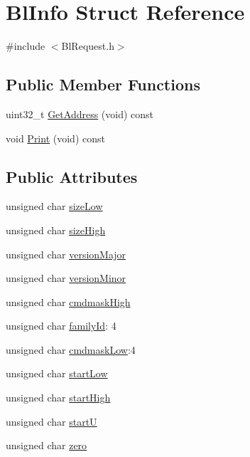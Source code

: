 \hypertarget{struct_bl_info}{\section{Bl\-Info Struct Reference}
\label{struct_bl_info}
}


{\ttfamily \#include $<$Bl\-Request.\-h$>$}

\subsection*{Public Member Functions}
\begin{DoxyCompactItemize}
\item 
uint32\-\_\-t \hyperlink{struct_bl_info_a54a7c7a8982f9ed99517977a9089da62}{Get\-Address} (void) const 
\item 
void \hyperlink{struct_bl_info_a4deedea65fec600c73ad4097659a4cfa}{Print} (void) const 
\end{DoxyCompactItemize}
\subsection*{Public Attributes}
\begin{DoxyCompactItemize}
\item 
unsigned char \hyperlink{struct_bl_info_af53fd31e97f796089198cf77681ba9cb}{size\-Low}
\item 
unsigned char \hyperlink{struct_bl_info_a17fd7e3d13075c98cb3589a5670eaa27}{size\-High}
\item 
unsigned char \hyperlink{struct_bl_info_adecf35498759a50f70cfd720930c2fee}{version\-Major}
\item 
unsigned char \hyperlink{struct_bl_info_a013455b390e6a994503fc913ef4962ec}{version\-Minor}
\item 
unsigned char \hyperlink{struct_bl_info_a6230bfa0bbba06b6d4cbf4a091f29206}{cmdmask\-High}
\item 
unsigned char \hyperlink{struct_bl_info_aa83c1399c74fbc43483497e25d01a944}{family\-Id}\-: 4
\item 
unsigned char \hyperlink{struct_bl_info_a1f12826be55d13f19c756bc5e3428b3c}{cmdmask\-Low}\-:4
\item 
unsigned char \hyperlink{struct_bl_info_a4d08750ac1951abfae43f350f11e6e74}{start\-Low}
\item 
unsigned char \hyperlink{struct_bl_info_a952bed33ae2583318cb548e5af1ee0f7}{start\-High}
\item 
unsigned char \hyperlink{struct_bl_info_ad0ff495d980e4852f048e4b8f3f937aa}{start\-U}
\item 
unsigned char \hyperlink{struct_bl_info_a46dfaab15225f0149142be16b0976216}{zero}
\end{DoxyCompactItemize}


